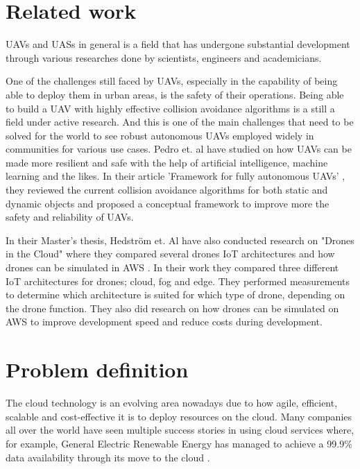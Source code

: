 
\section{Related work}
\label{sec:related-work}

UAVs and UASs in general is a field that has undergone substantial development through various researches done by scientists, engineers and academicians.

One of the challenges still faced by UAVs, especially in the capability of being able to deploy them in urban areas, is the safety of their operations. Being able to build a UAV with highly effective collision avoidance algorithms is a still a field under active research. And this is one of the main challenges that need to be solved for the world to see robust autonomous UAVs employed widely in communities for various use cases. Pedro et. al have studied on how UAVs can be made more resilient and safe with the help of artificial intelligence, machine learning and the likes. In their article 'Framework for fully autonomous UAVs' \cite{Pedro2020}, they reviewed the current collision avoidance algorithms for both static and dynamic objects and proposed a conceptual framework to improve more the safety and reliability of UAVs.

In their Master's thesis, Hedström et. Al have also conducted research on "Drones in the Cloud" where they compared several drones IoT architectures and how drones can be simulated in AWS \cite{mscdronesinthecloud}. In their work they compared three different IoT architectures for drones; cloud, fog and edge. They performed measurements to determine which architecture is suited for which type of drone, depending on the drone function. They also did research on how drones can be simulated on AWS to improve development speed and reduce costs during development.




\section{Problem definition}
\label{sec:problem-definition}
The cloud technology is an evolving area nowadays due to how agile, efficient, scalable and cost-effective it is to deploy resources on the cloud. Many companies all over the world have seen multiple success stories in using cloud services where, for example, General Electric Renewable Energy has managed to achieve a 99.9\% data availability through its move to the cloud \cite{awsgerenewableenergy}.

